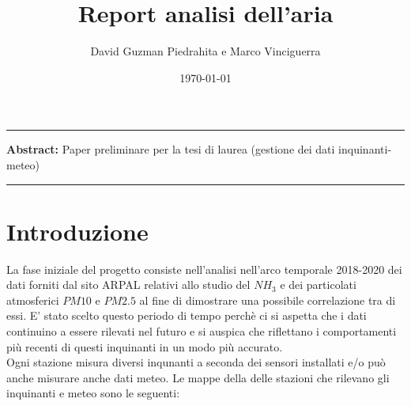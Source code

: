 \documentclass{article}
\title{Report analisi dell'aria}
\author{David Guzman Piedrahita e Marco Vinciguerra}
\date{\today}
\begin{document}
\maketitle

\par\noindent\rule{\textwidth}{0.4pt}
\textbf{Abstract:} Paper preliminare per la tesi di laurea (gestione dei dati inquinanti-meteo)
\par\noindent\rule{\textwidth}{0.4pt}

\section{Introduzione}
La fase iniziale del progetto consiste nell'analisi nell'arco temporale 2018-2020 dei dati 
forniti dal sito ARPAL relativi allo studio del $NH_{3}$ e dei particolati atmosferici $PM10$ e $PM2.5$ al 
fine di dimostrare una possibile correlazione tra di essi. 
E' stato scelto questo periodo di tempo perchè ci si aspetta che i dati continuino a essere rilevati nel futuro
e si auspica che riflettano i comportamenti più recenti di questi inquinanti in un modo più accurato.
\\Ogni stazione misura diversi inqunanti a seconda dei sensori installati e/o può anche misurare anche dati meteo.
Le mappe della delle stazioni che rilevano gli inquinanti e meteo sono le 
seguenti:
\end{document}
